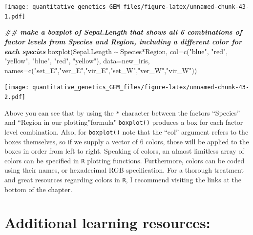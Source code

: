 \documentclass[
]{book}
\newenvironment{Shaded}{\begin{snugshade}}{\end{snugshade}}
\newcommand{\AttributeTok}[1]{\textcolor[rgb]{0.77,0.63,0.00}{#1}}
\newcommand{\DocumentationTok}[1]{\textcolor[rgb]{0.56,0.35,0.01}{\textbf{\textit{#1}}}}
\newcommand{\FunctionTok}[1]{\textcolor[rgb]{0.00,0.00,0.00}{#1}}
\newcommand{\NormalTok}[1]{#1}
\newcommand{\SpecialCharTok}[1]{\textcolor[rgb]{0.00,0.00,0.00}{#1}}
\newcommand{\StringTok}[1]{\textcolor[rgb]{0.31,0.60,0.02}{#1}}
\begin{document}
\texttt{[image: quantitative\_genetics\_GEM\_files/figure-latex/unnamed-chunk-43-1.pdf]}

\begin{Shaded}
\begin{Highlighting}[]
\DocumentationTok{\#\# make a boxplot of Sepal.Length that shows all 6 combinations of factor levels from Species and Region, including a different color for each species}
\FunctionTok{boxplot}\NormalTok{(Sepal.Length }\SpecialCharTok{\textasciitilde{}}\NormalTok{ Species}\SpecialCharTok{*}\NormalTok{Region, }\AttributeTok{col=}\FunctionTok{c}\NormalTok{(}\StringTok{"blue"}\NormalTok{, }\StringTok{"red"}\NormalTok{, }\StringTok{"yellow"}\NormalTok{, }\StringTok{"blue"}\NormalTok{, }\StringTok{"red"}\NormalTok{, }\StringTok{"yellow"}\NormalTok{),}
        \AttributeTok{data=}\NormalTok{new\_iris, }\AttributeTok{names=}\FunctionTok{c}\NormalTok{(}\StringTok{"set\_E"}\NormalTok{,}\StringTok{"ver\_E"}\NormalTok{,}\StringTok{"vir\_E"}\NormalTok{,}\StringTok{"set\_W"}\NormalTok{,}\StringTok{"ver\_W"}\NormalTok{,}\StringTok{"vir\_W"}\NormalTok{))}
\end{Highlighting}
\end{Shaded}

\texttt{[image: quantitative\_genetics\_GEM\_files/figure-latex/unnamed-chunk-43-2.pdf]}

Above you can see that by using the \texttt{*} character between the factors ``Species'' and ``Region in our plotting''formula" \texttt{boxplot()} produces a box for each factor level combination. Also, for \texttt{boxplot()} note that the ``col'' argument refers to the boxes themselves, so if we supply a vector of 6 colors, those will be applied to the boxes in order from left to right. Speaking of colors, an almost limitless array of colors can be specified in \texttt{R} plotting functions. Furthermore, colors can be coded using their names, or hexadecimal RGB specification. For a thorough treatment and great resources regarding colors in \texttt{R}, I recommend visiting the links at the bottom of the chapter.

\hypertarget{additional-learning-resources-2}{%
\section{Additional learning resources:}\label{additional-learning-resources-2}}
\end{document}
